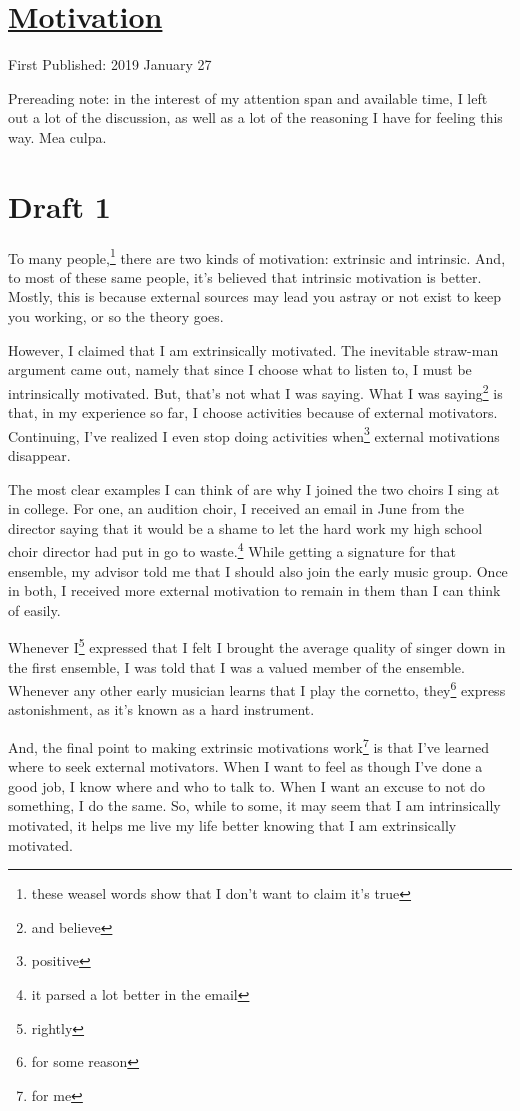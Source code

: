 \documentclass[12pt]{article}[titlepage]
\newcommand{\1}{\={a}}
\newcommand{\2}{\={e}}
\newcommand{\3}{\={\i}}
\newcommand{\4}{\=o}
\newcommand{\5}{\=u}
\newcommand{\6}{\={A}}
\renewcommand{\,}{\textsuperscript{,}}
\begin{document}
\doublespacing
\section{\href{motivation.html}{Motivation}}
First Published: 2019 January 27

Prereading note: in the interest of my attention span and available time, I left out a lot of the discussion, as well as a lot of the reasoning I have for feeling this way.
Mea culpa.
\section{Draft 1}
To many people,\footnote{these weasel words show that I don't want to claim it's true} there are two kinds of motivation: extrinsic and intrinsic.
And, to most of these same people, it's believed that intrinsic motivation is better.
Mostly, this is because external sources may lead you astray or not exist to keep you working, or so the theory goes.

However, I claimed that I am extrinsically motivated.
The inevitable straw-man argument came out, namely that since I choose what to listen to, I must be intrinsically motivated.
But, that's not what I was saying.
What I was saying\footnote{and believe} is that, in my experience so far, I choose activities because of external motivators.
Continuing, I've realized I even stop doing activities when\footnote{positive} external motivations disappear.

The most clear examples I can think of are why I joined the two choirs I sing at in college.
For one, an audition choir, I received an email in June from the director saying that it would be a shame to let the hard work my high school choir director had put in go to waste.\footnote{it parsed a lot better in the email}
While getting a signature for that ensemble, my advisor told me that I should also join the early music group.
Once in both, I received more external motivation to remain in them than I can think of easily.

Whenever I\footnote{rightly} expressed that I felt I brought the average quality of singer down in the first ensemble, I was told that I was a valued member of the ensemble.
Whenever any other early musician learns that I play the cornetto, they\footnote{for some reason} express astonishment, as it's known as a hard instrument.

And, the final point to making extrinsic motivations work\footnote{for me} is that I've learned where to seek external motivators.
When I want to feel as though I've done a good job, I know where and who to talk to.
When I want an excuse to not do something, I do the same.
So, while to some, it may seem that I am intrinsically motivated, it helps me live my life better knowing that I am extrinsically motivated.
\end{document}
